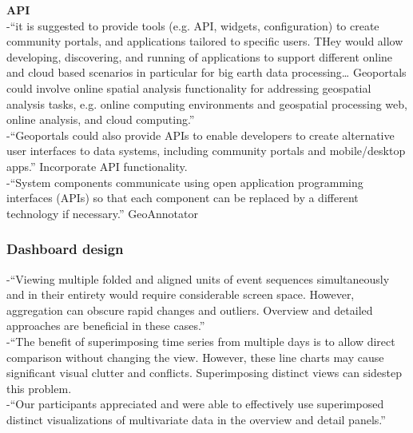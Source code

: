 \textbf{API}\\
-{\color{orange}“it is suggested to provide tools (e.g. API, widgets, configuration) to create community portals, and applications tailored to specific users. THey would allow developing, discovering, and running of applications to support different online and cloud based scenarios in particular for big earth data processing… Geoportals could involve online spatial analysis functionality for addressing geospatial analysis tasks, e.g. online computing environments and geospatial processing web, online analysis, and cloud computing.”\cite{Jiang2020}}\\
-{\color{orange}“Geoportals could also provide APIs to enable developers to create alternative user interfaces to data systems, including community portals and mobile/desktop apps.” Incorporate API functionality.\cite{Jiang2020}}\\
-{\color{orange}“System components communicate using open application programming interfaces (APIs) so that each component can be replaced by a different technology if necessary.” GeoAnnotator \cite{Karimzadeh2019}}\\

\subsubsection{Dashboard design}
-{\color{orange}“Viewing multiple folded and aligned units of event sequences simultaneously and in their entirety would require considerable screen space. However, aggregation can obscure rapid changes and outliers. Overview and detailed approaches are beneficial in these cases.”\cite{Zhang2019}}\\
-{\color{orange}“The benefit of superimposing time series from multiple days is to allow direct comparison without changing the view. However, these line charts may cause significant visual clutter and conflicts. Superimposing distinct views can sidestep this problem.\cite{Zhang2019}}\\
-{\color{orange}“Our participants appreciated and were able to effectively use superimposed distinct visualizations of multivariate data in the overview and detail panels.”\cite{Zhang2019}}\\

